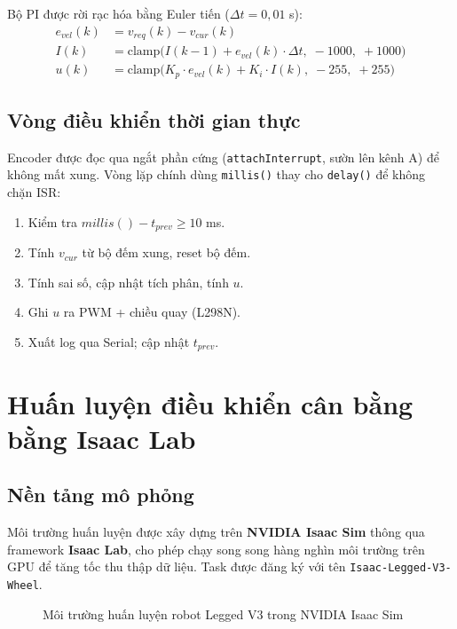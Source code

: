 Bộ PI được rời rạc hóa bằng Euler tiến ($\Delta t = 0{,}01$ s):
\begin{align}
    e_{vel}(k) &= v_{req}(k) - v_{cur}(k) \\
    I(k) &= \mathrm{clamp}\bigl(I(k{-}1) + e_{vel}(k)\cdot\Delta t,\;
            -1000,\;+1000\bigr) \\
    u(k) &= \mathrm{clamp}\bigl(K_p\cdot e_{vel}(k) + K_i\cdot I(k),\;
            -255,\;+255\bigr)
\end{align}

\subsection{Vòng điều khiển thời gian thực}

Encoder được đọc qua ngắt phần cứng (\texttt{attachInterrupt}, sườn lên kênh A)
để không mất xung. Vòng lặp chính dùng \texttt{millis()} thay cho
\texttt{delay()} để không chặn ISR:
\begin{enumerate}
    \item Kiểm tra $millis() - t_{prev} \geq 10$ ms.
    \item Tính $v_{cur}$ từ bộ đếm xung, reset bộ đếm.
    \item Tính sai số, cập nhật tích phân, tính $u$.
    \item Ghi $u$ ra PWM + chiều quay (L298N).
    \item Xuất log qua Serial; cập nhật $t_{prev}$.
\end{enumerate}


\section{Huấn luyện điều khiển cân bằng bằng Isaac Lab}

\subsection{Nền tảng mô phỏng}

Môi trường huấn luyện được xây dựng trên \textbf{NVIDIA Isaac Sim} thông qua
framework \textbf{Isaac Lab}, cho phép chạy song song hàng nghìn môi trường
trên GPU để tăng tốc thu thập dữ liệu. Task được đăng ký với tên
\texttt{Isaac-Legged-V3-Wheel}.

\begin{figure}[H]
    \centering
    \caption{Môi trường huấn luyện robot Legged V3 trong NVIDIA Isaac Sim}
    \label{fig:isaaclab_env}
\end{figure}

